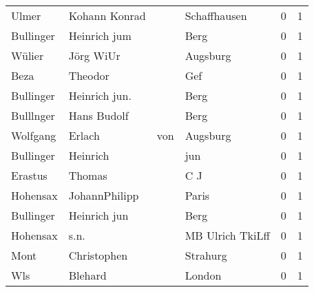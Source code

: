 \begin{center}
\begin{tiny}
\begin{longtabu}{llllrr}
                    Ulmer &                      Kohann Konrad &             &                                Schaffhausen &          0 &         1 \\
                Bullinger &                       Heinrich jum &             &                                        Berg &          0 &         1 \\
                   Wülier &                          Jörg WiUr &             &                                    Augsburg &          0 &         1 \\
                     Beza &                            Theodor &             &                                         Gef &          0 &         1 \\
                Bullinger &                      Heinrich jun. &             &                                        Berg &          0 &         1 \\
                Bulllnger &                        Hans Budolf &             &                                        Berg &          0 &         1 \\
                 Wolfgang &                             Erlach &         von &                                    Augsburg &          0 &         1 \\
                Bullinger &                           Heinrich &             &                                         jun &          0 &         1 \\
                  Erastus &                             Thomas &             &                                         C J &          0 &         1 \\
                 Hohensax &                      JohannPhilipp &             &                                       Paris &          0 &         1 \\
                Bullinger &                       Heinrich jun &             &                                        Berg &          0 &         1 \\
                 Hohensax &                               s.n. &             &                            MB Ulrich TkiLff &          0 &         1 \\
                     Mont &                        Christophen &             &                                    Strahurg &          0 &         1 \\
                      Wls &                            Blehard &             &                                      London &          0 &         1 \\

\end{longtabu}
\end{tiny}
\end{center}
